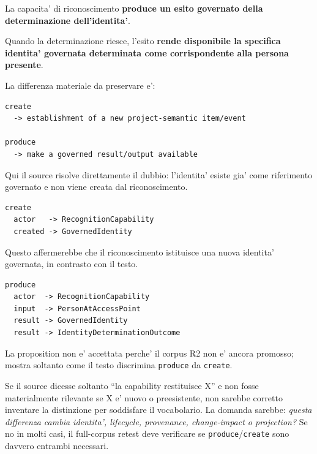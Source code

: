 \documentclass[11pt,a4paper]{article}
\newcommand{\code}[1]{\nolinkurl{#1}}
\begin{document}
\begin{sourcebox}
La capacita' di riconoscimento \textbf{produce un esito governato della determinazione dell'identita'}.

Quando la determinazione riesce, l'esito \textbf{rende disponibile la specifica identita' governata determinata come corrispondente alla persona presente}.
\end{sourcebox}

La differenza materiale da preservare e':

\begin{lstlisting}
create
  -> establishment of a new project-semantic item/event

produce
  -> make a governed result/output available
\end{lstlisting}

Qui il source risolve direttamente il dubbio: l'identita' esiste gia' come riferimento governato e non viene creata dal riconoscimento.

\begin{badbox}
\begin{lstlisting}
create
  actor   -> RecognitionCapability
  created -> GovernedIdentity
\end{lstlisting}
Questo affermerebbe che il riconoscimento istituisce una nuova identita' governata, in contrasto con il testo.
\end{badbox}

\begin{goodbox}
\begin{lstlisting}
produce
  actor  -> RecognitionCapability
  input  -> PersonAtAccessPoint
  result -> GovernedIdentity
  result -> IdentityDeterminationOutcome
\end{lstlisting}
La proposition non e' accettata perche' il corpus R2 non e' ancora promosso; mostra soltanto come il testo discrimina \code{produce} da \code{create}.
\end{goodbox}

\begin{reviewbox}
Se il source dicesse soltanto ``la capability restituisce X'' e non fosse materialmente rilevante se X e' nuovo o preesistente, non sarebbe corretto inventare la distinzione per soddisfare il vocabolario. La domanda sarebbe: \emph{questa differenza cambia identita', lifecycle, provenance, change-impact o projection?} Se no in molti casi, il full-corpus retest deve verificare se \code{produce}/\code{create} sono davvero entrambi necessari.
\end{reviewbox}
\end{document}

